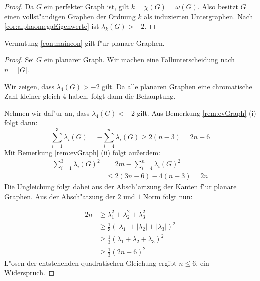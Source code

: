\begin{proof}
  Da $G$ ein perfekter Graph ist, gilt $k = \chi(G) = \omega(G)$. Also besitzt $G$ einen vollst"andigen Graphen der Ordnung $k$ als induzierten Untergraphen. Nach \ref{cor:alphaomegaEigenwerte} ist $\lambda_{k}(G) > -2$.
\end{proof}

\begin{proposition}
  Vermutung \ref{con:maincon} gilt f"ur planare Graphen.
\end{proposition}

\begin{proof}
  Sei $G$ ein planarer Graph. Wir machen eine Fallunterscheidung nach $n = |G|$. 
  \todo{}

  \parindent 0pt 
  Wir zeigen, dass $\lambda_4(G) > -2$ gilt. Da alle planaren Graphen eine chromatische Zahl kleiner gleich $4$ haben, folgt dann die Behauptung.

  Nehmen wir daf"ur an, dass $\lambda_{4}(G) < -2$ gilt.
  Aus Bemerkung \ref{rem:evGraph} (i) folgt dann:
  \begin{equation*}
    \sum\limits_{i=1}^3 \lambda_{i}(G) = -\sum\limits_{i=4}^{n}\lambda_{i}(G) \geq 2 (n-3) = 2n-6
  \end{equation*}
  Mit Bemerkung \ref{rem:evGraph} (ii) folgt au{\ss}erdem:
  \begin{align*}
    \sum\limits_{i=1}^3 \lambda_{i}(G)^{2} &= 2m -\sum\limits_{i=4}^{n}\lambda_{i}(G)^{2} \\
    &\leq 2(3n-6) -4(n-3) = 2n
  \end{align*}
  Die Ungleichung folgt dabei aus der Absch"artzung der Kanten f"ur planare Graphen. Aus der Absch"atzung der $2$ und $1$ Norm folgt nun:

  \begin{align*}
    2n &\geq \lambda_{1}^{2} +\lambda_{2}^{2} +\lambda_{3}^{2}  \\ &\geq \frac{1}{3} (|\lambda_{1}| + |\lambda_2| + |\lambda_3|)^{2} \\
    &\geq \frac{1}{3}(\lambda_{1}+ \lambda_2 + \lambda_3)^{2}\\ &\geq \frac{1}{3}(2n-6)^{2}
  \end{align*}
  L"osen der entstehenden quadratischen Gleichung ergibt $n\leq 6$, ein Widerspruch.
\end{proof} 

